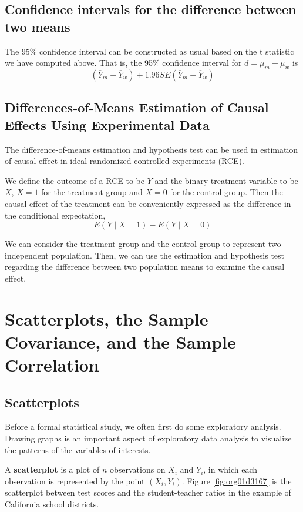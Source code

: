 \documentclass[a4paper,11pt]{article}
\begin{document}
\subsection{Confidence intervals for the difference between two means}
\label{sec:org2f482f7}

The 95\% confidence interval can be constructed as usual based on the t
statistic we have computed above. That is, the 95\% confidence interval
for \(d = \mu_m - \mu_w\) is
\[ (\overline{Y}_m - \overline{Y}_w) \pm 1.96SE(\overline{Y}_m -
\overline{Y}_w) \]

\subsection{Differences-of-Means Estimation of Causal Effects Using Experimental Data}
\label{sec:org90d196b}

The difference-of-means estimation and hypothesis test can be used in
estimation of causal effect in ideal randomized controlled
experiments (RCE). 

We define the outcome of a RCE to be \(Y\) and the binary treatment
variable to be \(X\), \(X=1\) for the treatment group and \(X=0\) for the
control group. Then the causal effect of the treatment can be
conveniently expressed as the difference in the conditional
expectation, 
\[ E(Y \mid X=1) - E(Y \mid X=0)  \]

We can consider the treatment group and the control group to represent two
independent population. Then, we can use the estimation and hypothesis
test regarding the difference between two population means to examine
the causal effect. 


\section{Scatterplots, the Sample Covariance, and the Sample Correlation}
\label{sec:org695e0e6}

\subsection{Scatterplots}
\label{sec:orga03f956}

Before a formal statistical study, we often first do some exploratory
analysis. Drawing graphs is an important aspect of exploratory data
analysis to visualize the patterns of the variables of
interests. 

A \textbf{scatterplot} is a plot of \(n\) observations on \(X_i\) and \(Y_i\), in
which each observation is represented by the point \((X_i,
Y_i)\). Figure \ref{fig:org01d3167} is the scatterplot between test scores and the
student-teacher ratios in the example of California school districts. 
\end{document}
